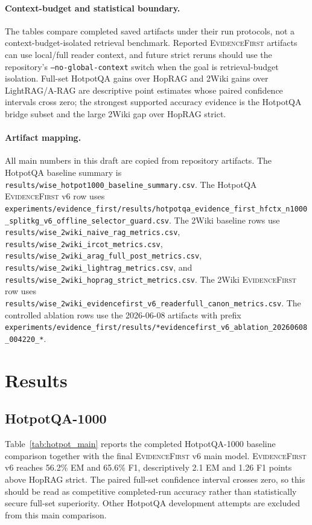 \documentclass[runningheads]{llncs}
\newcommand{\sys}{\textsc{EvidenceFirst}\xspace}
\begin{document}
\paragraph{Context-budget and statistical boundary.}
The tables compare completed saved artifacts under their run protocols, not a
context-budget-isolated retrieval benchmark. Reported \sys artifacts can use
local/full reader context, and future strict reruns should use the repository's
\texttt{--no-global-context} switch when the goal is retrieval-budget isolation.
Full-set HotpotQA gains over HopRAG and 2Wiki gains over LightRAG/A-RAG are
descriptive point estimates whose paired confidence intervals cross zero; the
strongest supported accuracy evidence is the HotpotQA bridge subset and the
large 2Wiki gap over HopRAG strict.

\paragraph{Artifact mapping.}
All main numbers in this draft are copied from repository artifacts. The
HotpotQA baseline summary is
\texttt{results/wise\_hotpot1000\_baseline\_summary.csv}. The HotpotQA \sys v6
row uses
\texttt{experiments/evidence\_first/results/hotpotqa\_evidence\_first\_hfctx\_n1000\_splitkg\_v6\_offline\_selector\_guard.csv}.
The 2Wiki baseline rows use
\texttt{results/wise\_2wiki\_naive\_rag\_metrics.csv},
\texttt{results/wise\_2wiki\_ircot\_metrics.csv},
\texttt{results/wise\_2wiki\_arag\_full\_post\_metrics.csv},
\texttt{results/wise\_2wiki\_lightrag\_metrics.csv}, and
\texttt{results/wise\_2wiki\_hoprag\_strict\_metrics.csv}. The 2Wiki \sys row uses
\texttt{results/wise\_2wiki\_evidencefirst\_v6\_readerfull\_canon\_metrics.csv}.
The controlled ablation rows use the 2026-06-08 artifacts with prefix
\texttt{experiments/evidence\_first/results/*evidencefirst\_v6\_ablation\_20260608\_004220\_*}.

\section{Results}
\label{sec:results}

\subsection{HotpotQA-1000}

Table~\ref{tab:hotpot_main} reports the completed HotpotQA-1000 baseline
comparison together with the final \sys v6 main model. \sys v6 reaches
56.2\% EM and 65.6\% F1, descriptively 2.1 EM and 1.26 F1 points above HopRAG
strict. The paired full-set confidence interval crosses zero, so this should be
read as competitive completed-run accuracy rather than statistically secure
full-set superiority. Other HotpotQA development attempts are excluded from this
main comparison.
\end{document}
